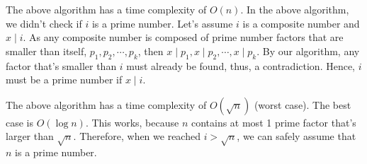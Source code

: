 \documentclass{article}
\begin{document}
The above algorithm has a time complexity of $O(n)$. In the above algorithm, we didn't check if $i$ is a prime number. Let's assume $i$ is a composite number and $x \mid i$. As any composite number is composed of prime number factors that are smaller than itself, $p_1, p_2, \cdots, p_k$, then $x \mid p_1, x \mid p_2, \cdots, x \mid p_k$. By our algorithm, any factor that's smaller than $i$ must already be found, thus, a contradiction. Hence, $i$ must be a prime number if $x \mid i$.


The above algorithm has a time complexity of $O(\sqrt{n})$ (worst case). The best case is $O(\log n)$. This works, because $n$ contains at most 1 prime factor that's larger than $\sqrt{n}$. Therefore, when we reached $i > \sqrt{n}$, we can safely assume that $n$ is a prime number.
\end{document}
